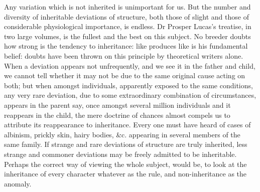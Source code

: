 \indent Any variation which is not inherited is unimportant for us. But the number and diversity of inheritable deviations of structure, both those of slight and those of considerable physiological importance, is endless. Dr Prosper Lucas's treatise, in two large volumes, is the fullest and the best on this subject. No breeder doubts how strong is the tendency to inheritance: like produces like is his fundamental belief: doubts have been thrown on this principle by theoretical writers alone. When a deviation appears not unfrequently, and we see it in the father and child, we cannot tell whether it may not be due to the same original cause acting on both; but when amongst individuals, apparently exposed to the same conditions, any very rare deviation, due to some extraordinary combination of circumstances, appears in the parent say, once amongst several million individuals and it reappears in the child, the mere doctrine of chances almost compels us to attribute its reappearance to inheritance. Every one must have heard of cases of albinism, prickly skin, hairy bodies, \&c.  appearing in several members of the same family. If strange and rare deviations of structure are truly inherited, less strange and commoner deviations may be freely admitted to be inheritable. Perhaps the correct way of viewing the whole subject, would be, to look at the inheritance of every character whatever as the rule, and non-inheritance as the anomaly.  \\
